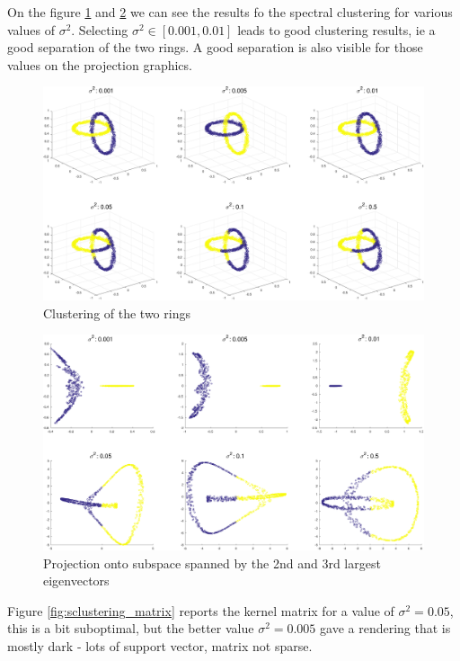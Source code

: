 \documentclass[11pt, a4paper]{article}
\begin{document}
On the figure \ref{fig:sclustering_origcl} and
\ref{fig:sclustering_origcl2} we can see the results fo the spectral
clustering for various values of $\sigma^2$. Selecting
$\sigma^2 \in [0.001,0.01]$ leads to good clustering results, ie a
good separation of the two rings. A good separation is also visible
for those values on the projection graphics.

\begin{figure}[H]
  \vspace{-10pt}
  \centering
  \includegraphics[scale=.35]{sclustering_origcl.pdf}
  \caption{Clustering of the two rings}
  \label{fig:sclustering_origcl}
\end{figure}

\begin{figure}[H]
  \centering
  \includegraphics[scale=.35]{sclustering_origcl2.pdf}
  \caption{Projection onto subspace spanned by the 2nd and 3rd largest
    eigenvectors}
  \label{fig:sclustering_origcl2}
\end{figure}

Figure \ref{fig:sclustering_matrix} reports the kernel matrix for a
value of $\sigma^2=0.05$, this is a bit suboptimal, but the better
value $\sigma^2=0.005$ gave a rendering that is mostly dark - lots of
support vector, matrix not sparse.
\end{document}

